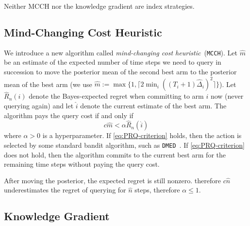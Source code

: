 \documentclass[a4paper]{article}
\def\regretHAT{\hat{R}}
\begin{document}
Neither MCCH nor the knowledge gradient are index strategies.

\subsection{Mind-Changing Cost Heuristic}

We introduce a new algorithm called \emph{mind-changing cost heuristic}~(\texttt{MCCH}).
Let $\hat{m}$ be an estimate of the expected number of time steps
we need to query in succession to move the posterior mean of the second best arm to the posterior mean of the best arm
(we use $\hat{m} := \max\{ 1, \lceil 2\min_i ((T_i + 1) \hat{\Delta}_i)^2 \rceil \}$).
Let $\regretHAT_n(i)$ denote the Bayes-expected regret
when committing to arm $i$ now (never querying again) and
let $\hat{i}$ denote the current estimate of the best arm.
%
The algorithm pays the query cost if and only if
\begin{equation}\label{eq:PRQ-criterion}
c\hat{m} < \alpha \regretHAT_n(\hat{i})
\end{equation}
where $\alpha > 0$ is a hyperparameter.
If \eqref{eq:PRQ-criterion} holds,
then the action is selected by some standard bandit algorithm,
such as \texttt{DMED}~\citep{Honda10}.
If \eqref{eq:PRQ-criterion} does not hold,
then the algorithm commits to the current best arm for the remaining time steps without paying the query cost.

After moving the posterior,
the expected regret is still nonzero.
therefore $c\hat{n}$ underestimates the regret
of querying for $\hat{n}$ steps,
therefore $\alpha \leq 1$.


\subsection{Knowledge Gradient}
\end{document}
